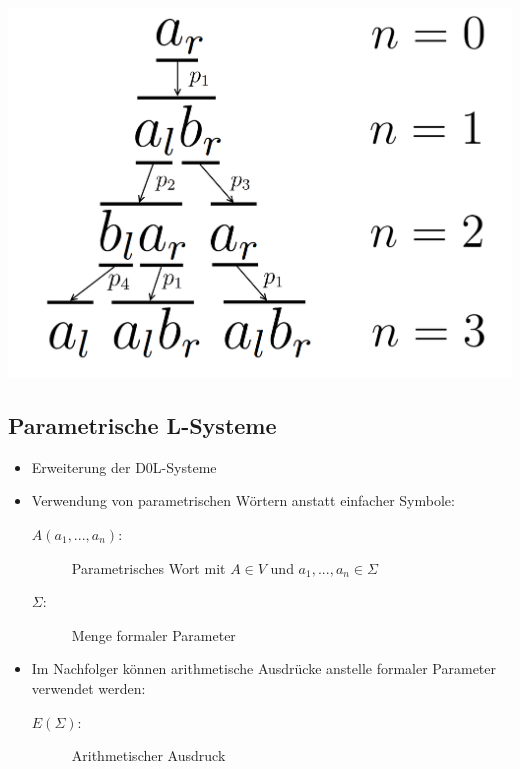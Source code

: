 \newpage

\begin{center}
	\includegraphics[height=1\textheight]{images/CH2_AnabaenaAbleitung.png}
\end{center}





\newpage
{}
\subsection{Parametrische L-Systeme\\ }

\begin{itemize}
	\item Erweiterung der D0L-Systeme \\
	
	\item Verwendung von parametrischen Wörtern anstatt einfacher Symbole:
	\begin{description}
			\item[\boldmath$A(a_1, ..., a_n):$] Parametrisches Wort mit $A\in V$ und $a_1, ..., a_n \in \Sigma$
		
			\item[\boldmath$\Sigma:$] Menge formaler Parameter
		
	\end{description}
	
	\item Im Nachfolger können arithmetische Ausdrücke anstelle formaler Parameter verwendet werden:
	\begin{description}
		
		\item[\boldmath$E(\Sigma):$] Arithmetischer Ausdruck
	\end{description}

\end{itemize}





